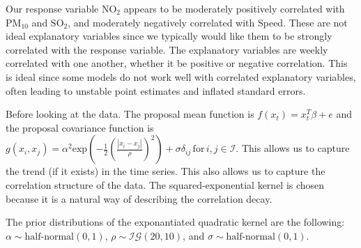 \documentclass[a4paper, 10pt]{article}
\begin{document}
\begin{flushleft}
      Our response variable $\text{NO}_{2}$ appears to be moderately positively correlated with $\text{PM}_{10}$ and $\text{SO}_{2}$, and moderately negatively correlated with Speed. These are not ideal explanatory variables since we typically would like them to be strongly correlated with the response variable. The explanatory variables are weekly correlated with one another, whether it be positive or negative correlation. This is ideal since some models do not work well with correlated explanatory variables, often leading to unstable point estimates and inflated standard errors.

      \vspace{1em}

      Before looking at the data. The proposal mean function is $f(x_{t}) = x_{t}^{T} \beta + e$ and the proposal covariance function is $g(x_{i}, x_{j}) = \alpha^{2} \text{exp}(- \frac{1}{2} (\frac{|x_i - x_j|}{\rho})^2) + \sigma\delta_{ij} \, \text{for} \, i,j \in \mathcal{I}$. This allows us to capture the trend (if it exists) in the time series. This also allows us to capture the correlation structure of the data. The squared-exponential kernel is chosen because it is a natural way of describing the correlation decay.

      \vspace{1em}

      The prior distributions of the exponantiated quadratic kernel are the following: $\alpha \sim \text{half-normal}(0, 1)$, $\rho \sim \mathcal{IG}(20, 10)$, and $\sigma \sim \text{half-normal}(0, 1)$.


\end{flushleft}
\end{document}
